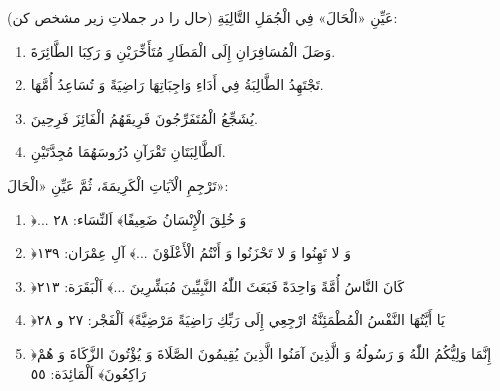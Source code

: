 \begin{JTest}
عَيِّنِ «الْحَالَ» فِي الْجُمَلِ التَّالِيَةِ (حال را در جملاتِ زیر مشخص کن):

\begin{enumerate}
  \item وَصَلَ الْمُسَافِرَانِ إِلَى الْمَطَارِ مُتَأَخِّرَيْنِ وَ رَكِبَا
        الطَّائِرَةَ.
  \item تَجْتَهِدُ الطَّالِبَةُ فِي أَدَاءِ وَاجِبَاتِهَا رَاضِيَةً وَ
        تُسَاعِدُ أُمَّهَا.
  \item يُشَجِّعُ الْمُتَفَرِّجُونَ فَرِيقَهُمُ الْفَائِزَ فَرِحِينَ.
  \item اَلطَّالِبَتَانِ تَقْرَآنِ دُرُوسَهُمَا مُجِدَّتَيْنِ.
\end{enumerate}
\end{JTest}

\begin{JTest}
تَرْجِمِ الْآيَاتِ الْكَرِيمَةَ، ثُمَّ عَيِّنِ «الْحَالَ»:

\begin{enumerate}
  \item ﴿... وَ خُلِقَ الْإِنْسَانُ ضَعِيفًا﴾ اَلنِّسَاء: ٢٨
  \item ﴿وَ لا تَهِنُوا وَ لا تَحْزَنُوا وَ أَنْتُمُ الْأَعْلَوْنَ
        ...﴾ آلِ عِمْرَان: ١٣٩
  \item ﴿كَانَ النَّاسُ أُمَّةً وَاحِدَةً فَبَعَثَ اللّٰهُ النَّبِيِّينَ
        مُبَشِّرِينَ ...﴾ اَلْبَقَرَة: ٢١٣
  \item ﴿يَا أَيَّتُهَا النَّفْسُ الْمُطْمَئِنَّةُ ارْجِعِي إِلَى رَبِّكِ
        رَاضِيَةً مَرْضِيَّةً﴾ اَلْفَجْر: ٢٧ و ٢٨
  \item ﴿إِنَّمَا وَلِيُّكُمُ اللّٰهُ وَ رَسُولُهُ وَ الَّذِينَ آمَنُوا
        الَّذِينَ يُقِيمُونَ الصَّلَاةَ وَ يُؤْتُونَ الزَّكَاةَ وَ
        هُمْ رَاكِعُونَ﴾ اَلْمَائِدَة: ٥٥
\end{enumerate}
\end{JTest}


